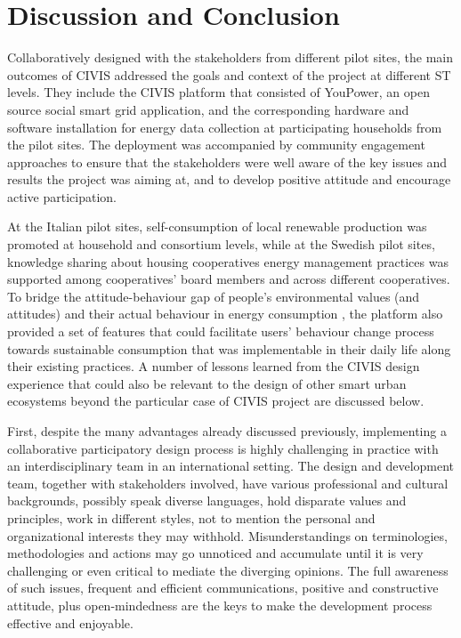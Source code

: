
\section{Discussion and Conclusion}

Collaboratively designed with the stakeholders from different pilot sites, the main outcomes of CIVIS addressed the goals and context of the project at different ST levels. They include the CIVIS platform that consisted of YouPower, an open source social smart grid application, and the corresponding hardware and software installation for energy data collection at participating households from the pilot sites. The   deployment was accompanied by community engagement approaches to ensure that the stakeholders were well aware of the key issues and results the project was aiming at, and to develop positive attitude and encourage active participation. 
% 

At the Italian pilot sites, self-consumption of local renewable production was promoted at household and consortium levels, while at the Swedish pilot sites, knowledge sharing about housing cooperatives energy management practices was supported among cooperatives' board members and across different cooperatives. To bridge the attitude-behaviour gap of people's environmental values (and attitudes) and their actual behaviour in energy consumption \cite{Kollmuss2002,Schultz2002,Schultz2014}, the platform also provided a set of features that could facilitate users' behaviour change process towards sustainable  consumption that was implementable in their daily life along their existing practices. 
% 
A number of lessons learned from the CIVIS design experience that could also be relevant to the design of other smart urban ecosystems beyond the particular case of CIVIS project are discussed below. 
% 

First, despite the many advantages already discussed previously, implementing a collaborative participatory design process is highly challenging in practice with an interdisciplinary team in an international setting. The design and development team, together with stakeholders involved, have various professional and cultural backgrounds, possibly speak diverse languages, hold disparate values and principles, work in different styles, not to mention the personal and organizational interests they may withhold. Misunderstandings on terminologies,  methodologies and actions may go unnoticed and accumulate until it is very challenging or even critical to mediate the diverging opinions. The full awareness of such issues, frequent and efficient communications,  positive and constructive attitude, plus open-mindedness are the keys to make the development process effective and enjoyable.
% 

